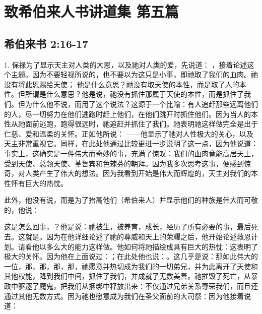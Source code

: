 
\section{致希伯来人书讲道集 第五篇}


\subsection{希伯来书 2:16-17}

\par

1. 保禄为了显示天主对人类的大恩，以及祂对人类的爱，先说道： ，接着论述这个主题。因为不要轻视所说的，也不要以为这只是小事，即祂取了我们的血肉。祂没有将此恩赐给天使； 他是什么意思？祂没有取天使的本性，而是取了人的本性。但所谓是什么意思？他是说，祂没有抓住那属于天使的本性，而是抓住了我们。但为什么他不说，而用了这个说法？这源于一个比喻：有人追赶那些远离他们的人，尽一切努力在他们逃跑时赶上他们，在他们跳开时抓住他们。因为当人的本性从祂面前逃跑，跑得很远时，祂追赶并抓住了我们。祂表明祂这样做完全是出于仁慈、爱和温柔的关怀。正如他所说： ——他显示了祂对人性极大的关心，以及天主非常重视它。同样，在此处他通过比较更进一步说明了这一点，因为他说道： 事实上，这确实是一件伟大而奇妙的事，充满了惊叹：我们的血肉竟能高居天上，受到天使、总领天使、革鲁宾和色辣芬的朝拜。因为我多次思考这事，便感到惊奇，对人类产生了伟大的想法。因为我看到开始是伟大而辉煌的，天主对我们的本性怀有巨大的热忱。\par

此外，他没有说，而是为了抬高他们（希伯来人）并显示他们的种族是伟大而可敬的，他说：\par

 这是怎么回事，？他是说：祂被生，被养育，成长，经历了所有必要的事，最后死去。这就是。因为在他详细论述了祂的尊威和天上的荣耀之后，他开始论述救恩计划。请看他以多么大的能力这样做。他如何将祂描绘成具有巨大的热忱：这表明了极大的关怀。因为他在上面说过：；在此处他也说：。这几乎是说：那如此伟大的一位，那，那，那，那，祂愿意并热切成为我们的一切弟兄，并为此离开了天使和其他权能，降到我们中间，抓住了我们，并成就了无数美善。祂摧毁了死亡，从暴政中驱逐了魔鬼，把我们从捆绑中释放出来：不仅通过兄弟关系尊荣我们，而且还通过其他无数方式。因为祂也愿意成为我们在圣父面前的大司祭：因为他接着说道：\par

